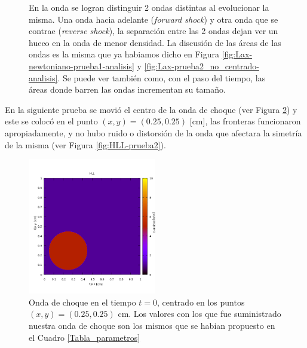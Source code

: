 \documentclass[12pt,a4paper]{book}
\begin{document}
\begin{figure}
\caption{\label{fig:HLL-prueba1-analisis}En la onda se logran distinguir 2 ondas distintas al evolucionar la misma. Una onda hacia adelante (\emph{forward shock}) y otra onda que se contrae (\emph{reverse shock}), la separación entre las 2 ondas dejan ver un hueco en la onda de menor densidad. La discusión de las áreas de las ondas es la misma que ya habiamos dicho en Figura \ref{fig:Lax-newtoniano-prueba1-analisis} y \ref{fig:Lax-prueba2_no_centrado-analisis}. Se puede ver también como, con el paso del tiempo, las áreas donde barren las ondas incrementan su tamaño.} 
\end{figure}


En la siguiente prueba se movió el centro de la onda de choque (ver Figura \ref{fig:onda_choque4_t_0}) y este se colocó en el punto $(x,y) = (0.25,0.25)$ [cm], las fronteras funcionaron apropiadamente, y no hubo ruido o distorsión de la onda que afectara la simetría de la misma (ver Figura \ref{fig:HLL-prueba2}).

\begin{figure}
\centering
\includegraphics[width=0.5\textwidth]{./Figuras/Pruebas/Prueba_onda_choque/onda_choque4_t_0}
\caption{\label{fig:onda_choque4_t_0}Onda de choque en el tiempo $t = 0$, centrado en los puntos $(x,y) = (0.25,0.25)$ cm. Los valores con los que fue suministrado nuestra onda de choque son los mismos que se habian propuesto en el Cuadro \ref{Tabla_parametros} }
\end{figure}
\end{document}
